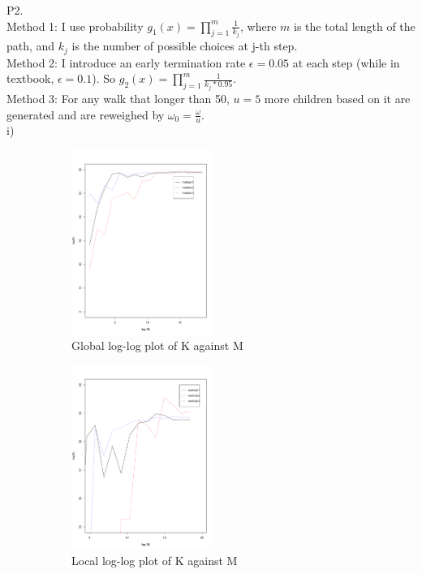 \documentclass[11pt,english]{article}
\begin{document}
P2.\\
Method 1: I use probability $g_1(x)=\displaystyle\prod_{j=1}^m\frac{1}{k_j}$, where $m$ is the total length of the path, and $k_j$ is the number of possible choices at j-th step.\\
Method 2: I introduce an early termination rate $\epsilon=0.05$ at each step (while in textbook, $\epsilon=0.1$). So $g_2(x) = \displaystyle\prod_{j=1}^m\frac{1}{k_j*0.95}$.\\
Method 3: For any walk that longer than 50, $u=5$ more children based on it are generated and are reweighed by $\omega_0 = \frac{\omega}{u}.$\\
i)\\
\begin{figure}[H]
	\centering
	\begin{subfigure}[b]{0.475\textwidth}
		\centering
		\includegraphics[width=\textwidth, height=6cm]{p2_1_1.pdf}
		\caption{Global log-log plot of K against M}\label{p2_1_1}
	\end{subfigure}
	\quad
	\begin{subfigure}[b]{0.475\textwidth}
		\centering
		\includegraphics[width=\textwidth, height=6cm]{p2_1_2.pdf}
		\caption{Local log-log plot of K against M}\label{p2_1_2}
	\end{subfigure}
	\caption{}
\end{figure}
\end{document}

